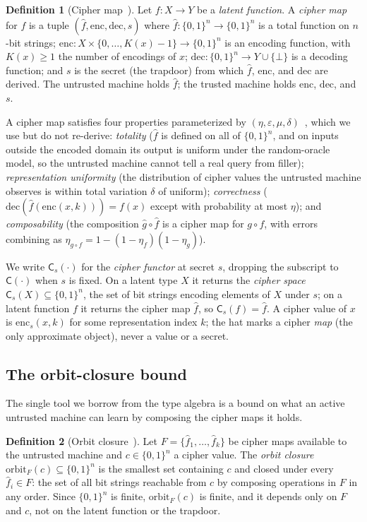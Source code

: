 \documentclass[11pt]{article}
\theoremstyle{definition}
\newtheorem{definition}{Definition}[section]
\theoremstyle{plain}
\theoremstyle{definition}
\theoremstyle{remark}
\newcommand{\enc}{\mathrm{enc}}
\newcommand{\dec}{\mathrm{dec}}
\newcommand{\fhat}{\hat{f}}
\newcommand{\ghat}{\hat{g}}
\newcommand{\cipher}[1]{\mathsf{C}(#1)}
\newcommand{\cipherS}[2]{\mathsf{C}_{#2}(#1)}
\newcommand{\orbitF}{\mathrm{orbit}_F}
\newcommand{\B}{\{0,1\}}
\begin{document}
\begin{definition}[Cipher map~{\cite[Def.~3.1]{towell2026cipher}}]
\label{def:cipher-map}
Let $f : X \to Y$ be a \emph{latent function}. A \emph{cipher map} for
$f$ is a tuple $(\fhat, \enc, \dec, s)$ where
$\fhat : \B^n \to \B^n$ is a total function on $n$-bit strings;
$\enc : X \times \{0, \ldots, K(x){-}1\} \to \B^n$ is an encoding
function, with $K(x) \geq 1$ the number of encodings of $x$;
$\dec : \B^n \to Y \cup \{\bot\}$ is a decoding function; and $s$ is
the secret (the trapdoor) from which $\fhat$, $\enc$, and $\dec$ are
derived. The untrusted machine holds $\fhat$; the trusted machine
holds $\enc$, $\dec$, and $s$.
\end{definition}

A cipher map satisfies four properties parameterized by
$(\eta, \varepsilon, \mu, \delta)$~\cite[Sec.~4]{towell2026cipher},
which we use but do not re-derive:
\emph{totality} ($\fhat$ is defined on all of $\B^n$, and on inputs
outside the encoded domain its output is uniform under the
random-oracle model, so the untrusted machine cannot tell a real query
from filler); \emph{representation uniformity} (the distribution of
cipher values the untrusted machine observes is within total variation
$\delta$ of uniform); \emph{correctness} ($\dec(\fhat(\enc(x,k))) =
f(x)$ except with probability at most $\eta$); and \emph{composability}
(the composition $\ghat \circ \fhat$ is a cipher map for $g \circ f$,
with errors combining as $\eta_{g\circ f} = 1 - (1-\eta_f)(1-\eta_g)$).

We write $\cipherS{\cdot}{s}$ for the \emph{cipher functor} at secret
$s$, dropping the subscript to $\cipher{\cdot}$ when $s$ is fixed. On a
latent type $X$ it returns the \emph{cipher space} $\cipherS{X}{s}
\subseteq \B^n$, the set of bit strings encoding elements of $X$ under
$s$; on a latent function $f$ it returns the cipher map $\fhat$, so
$\cipherS{f}{s} = \fhat$. A cipher value of $x$ is $\enc_s(x, k)$ for
some representation index $k$; the hat marks a cipher \emph{map}
(the only approximate object), never a value or a secret.

\subsection{The orbit-closure bound}

The single tool we borrow from the type algebra is a bound on what an
active untrusted machine can learn by composing the cipher maps it
holds.

\begin{definition}[Orbit closure~{\cite[Def.~5.1]{towell2026algebraic}}]
\label{def:orbit}
Let $F = \{\fhat_1, \ldots, \fhat_k\}$ be cipher maps available to the
untrusted machine and $c \in \B^n$ a cipher value. The \emph{orbit
closure} $\orbitF(c) \subseteq \B^n$ is the smallest set containing
$c$ and closed under every $\fhat_i \in F$: the set of all bit strings
reachable from $c$ by composing operations in $F$ in any order. Since
$\B^n$ is finite, $\orbitF(c)$ is finite, and it depends only on $F$
and $c$, not on the latent function or the trapdoor.
\end{definition}
\end{document}
